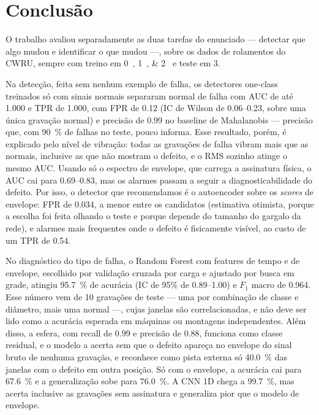 \chapter{Conclusão}
\label{cap:conclusao}

O trabalho avaliou separadamente as duas tarefas do enunciado --- detectar que
algo mudou e identificar o que mudou ---, sobre os dados de rolamentos do CWRU,
sempre com treino em \SIlist{0;1;2}{\hp} e teste em \SI{3}{\hp}.

Na detecção, feita sem nenhum exemplo de falha, os detectores one-class treinados só com
sinais normais separaram normal de falha com AUC de até \num{1.000} e TPR de
\num{1.000}, com FPR de \num{0.12} (IC de Wilson de \numrange{0.06}{0.23}, sobre
uma única gravação normal) e precisão de \num{0.99} no baseline de
Mahalanobis --- precisão que, com \SI{90}{\percent} de falhas no teste, pouco
informa. Esse resultado,
porém, é explicado pelo nível de vibração: todas as gravações de falha vibram
mais que as normais, inclusive as que não mostram o defeito, e o RMS sozinho
atinge o mesmo AUC. Usando só o espectro de envelope, que carrega a assinatura
física, o AUC cai para \numrange{0.69}{0.83}, mas os alarmes passam a seguir a
diagnosticabilidade do defeito. Por isso, o detector que recomendamos é o
autoencoder sobre os \emph{scores} de envelope: FPR de \num{0.034}, a menor entre
os candidatos (estimativa otimista, porque a escolha foi feita olhando o teste
e porque depende do tamanho do gargalo da rede),
e alarmes mais frequentes onde o defeito é fisicamente visível, ao custo de um
TPR de \num{0.54}.

No diagnóstico do tipo de falha, o Random Forest com features de tempo e de
envelope, escolhido por validação cruzada por carga e ajustado por busca em grade,
atingiu \SI{95.7}{\percent} de acurácia (IC de 95\% de \numrange{0.89}{1.00}) e
$F_1$ macro de \num{0.964}. Esse número vem de 10 gravações de teste --- uma por
combinação de classe e diâmetro, mais uma normal ---, cujas janelas são
correlacionadas, e não deve ser lido como a acurácia esperada em máquinas ou
montagens independentes. Além disso, a
esfera, com recall de \num{0.99} e precisão de \num{0.88}, funciona como
classe residual, e o modelo a acerta sem que o
defeito apareça no envelope do sinal bruto de nenhuma gravação, e reconhece como
pista externa só \SI{40.0}{\percent} das janelas com o defeito em outra posição.
Só com o envelope, a acurácia cai para \SI{67.6}{\percent} e a generalização sobe
para \SI{76.0}{\percent}. A CNN 1D chega a \SI{99.7}{\percent}, mas acerta
inclusive as gravações sem assinatura e generaliza pior que o modelo de
envelope.

